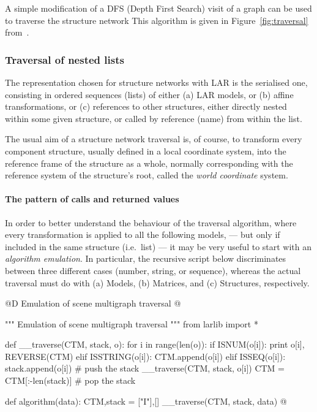 \documentclass[11pt,oneside]{article}    %
\begin{document}
A simple modification of a DFS (Depth First Search) visit of a graph can be used to traverse the structure network This algorithm is given in Figure~\ref{fig:traversal} from~\cite{Paoluzzi2003a}. 

\subsubsection{Traversal of nested lists}

The representation chosen for structure networks with LAR is the serialised one, consisting in ordered sequences (lists) of either (a) LAR models, or (b) affine transformations, or (c) references to other structures, either directly nested within some given structure, or called by reference (name) from within the list.

The usual aim of a structure network traversal is, of course, to transform every component structure, usually defined in a local coordinate system, into the reference frame of the structure as a whole, normally corresponding with the reference system of the structure's root, called the \emph{world coordinate} system.

\paragraph{The pattern of calls and returned values}

In order to better understand the behaviour of the traversal algorithm, where every transformation is applied to all the following models, --- but only if included in the same structure  (i.e.~list) --- it may be very useful to start with an \emph{algorithm emulation}. In particular, the recursive script below discriminates between three different cases (number, string, or sequence), whereas the actual traversal must do with (a) Models, (b) Matrices, and (c) Structures, respectively.

@D Emulation of scene multigraph traversal
@{""" Emulation of scene multigraph traversal """ 
from larlib import *

def __traverse(CTM, stack, o):
    for i in range(len(o)):
        if ISNUM(o[i]): print o[i], REVERSE(CTM)
        elif ISSTRING(o[i]): 
            CTM.append(o[i])
        elif ISSEQ(o[i]):
            stack.append(o[i])                # push the stack
            __traverse(CTM, stack, o[i])
            CTM = CTM[:-len(stack)]         # pop the stack

def algorithm(data):
    CTM,stack = ["I"],[]
    __traverse(CTM, stack, data)  
@}
\end{document}
